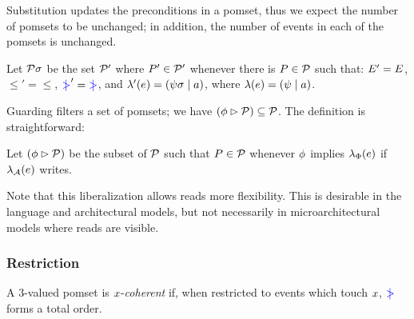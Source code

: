 Substitution updates the preconditions in a pomset, thus we expect the number
of pomsets to be unchanged; in addition, the number of events in each of the
pomsets is unchanged.
\begin{definition}
  Let $\mathcal{P}\sigma$ be the set $\mathcal{P}'$ where $P'\in\mathcal{P}'$ whenever
there is $P\in\mathcal{P}$ such that:
$E' = E$,
${\le'} = {\le}$, 
${\mathrel{{\color{blue}\mkern4mu\mid\!\!\!>}}'} = {\mathrel{{\color{blue}\mkern4mu\mid\!\!\!>}}}$,
and
$\lambda'(e) = (\psi\sigma \mid a)$, where $\lambda(e) = (\psi \mid a)$.
\end{definition}

Guarding filters a set of pomsets; we have
$(\phi\mathbin\rhd\mathcal{P})\subseteq\mathcal{P}$.
The definition is straightforward:
\begin{definition}
Let $(\phi \mathbin\rhd \mathcal{P})$ be the subset of $\mathcal{P}$ such that $P\in\mathcal{P}$ whenever
$\phi$ implies $\lambda_{\Phi}(e)$ if $\lambda_{\mathcal{A}}(e)$ writes.
\end{definition}
Note that this liberalization allows reads more flexibility.  This is
desirable in the language and architectural models, but not necessarily in
microarchitectural models where reads are visible.

\subsubsection{Restriction}
\label{sec:restriction}

\begin{definition}
  A 3-valued pomset is $x$-\emph{coherent}
  if, when restricted to events which touch $x$,
  $\mathrel{{\color{blue}\mkern4mu\mid\!\!\!>}}$ forms a total order.
\end{definition}


